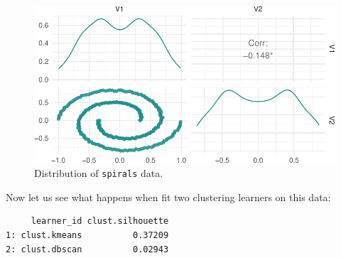 \begin{figure}[H]

{\centering \includegraphics[width=1\textwidth,height=\textheight]{chapters/chapter13/beyond_regression_and_classification_files/figure-pdf/fig-beyond-clust-spirals-1.pdf}

}

\caption{\label{fig-beyond-clust-spirals}Distribution of
\texttt{spirals} data.}

\end{figure}

Now let us see what happens when fit two clustering learners on this
data:

\begin{Shaded}
\begin{Highlighting}[]
\OtherTok{=} \NormalTok{(}
  \NormalTok{(}\NormalTok{),}
  \NormalTok{(}\NormalTok{, } \NormalTok{)}
\NormalTok{)}

\OtherTok{=} \NormalTok{(}\NormalTok{(}\NormalTok{)))}
\SpecialCharTok{$}\NormalTok{(}\NormalTok{(}\NormalTok{))[, }\NormalTok{(}\NormalTok{, }\NormalTok{)]}
\end{Highlighting}
\end{Shaded}

\begin{verbatim}
     learner_id clust.silhouette
1: clust.kmeans          0.37209
2: clust.dbscan          0.02943
\end{verbatim}

